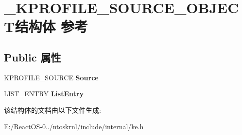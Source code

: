 \hypertarget{struct___k_p_r_o_f_i_l_e___s_o_u_r_c_e___o_b_j_e_c_t}{}\section{\+\_\+\+K\+P\+R\+O\+F\+I\+L\+E\+\_\+\+S\+O\+U\+R\+C\+E\+\_\+\+O\+B\+J\+E\+C\+T结构体 参考}
\label{struct___k_p_r_o_f_i_l_e___s_o_u_r_c_e___o_b_j_e_c_t}
\subsection*{Public 属性}
\begin{DoxyCompactItemize}
\item 
\mbox{\label{struct___k_p_r_o_f_i_l_e___s_o_u_r_c_e___o_b_j_e_c_t_adcf5ba9d2ee1a7bccafe5e820bfbf5ae}} 
K\+P\+R\+O\+F\+I\+L\+E\+\_\+\+S\+O\+U\+R\+CE {\bfseries Source}
\item 
\mbox{\label{struct___k_p_r_o_f_i_l_e___s_o_u_r_c_e___o_b_j_e_c_t_ac234bb1838c13f8809e4aeb6832ee488}} 
\hyperlink{struct___l_i_s_t___e_n_t_r_y}{L\+I\+S\+T\+\_\+\+E\+N\+T\+RY} {\bfseries List\+Entry}
\end{DoxyCompactItemize}


该结构体的文档由以下文件生成\+:\begin{DoxyCompactItemize}
\item 
E\+:/\+React\+O\+S-\/0../ntoskrnl/include/internal/ke.\+h\end{DoxyCompactItemize}
